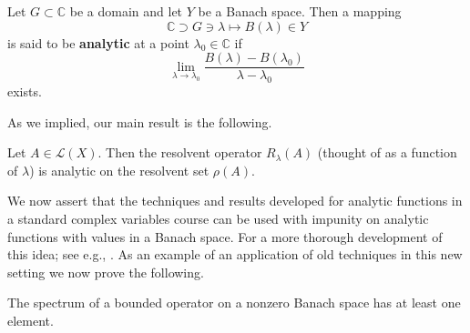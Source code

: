 \begin{Definition}
\label{def:banach-valued-analytic-function}
Let $G\subset\mathbb{C}$ be a domain and let $Y$ be a Banach space. Then a mapping
\begin{equation}\label{eq:banach-valued-complex-function-map}
\mathbb{C}\supset G\ni\lambda\mapsto B(\lambda)\in Y
\end{equation}
is said to be \textbf{analytic} at a point $\lambda_0\in\mathbb{C}$ if
\begin{equation}\label{eq:banach-valued-analytic-function-difference-quotient}
\lim_{\lambda\to\lambda_0}\dfrac{B(\lambda)-B(\lambda_0)}{\lambda-\lambda_0}
\end{equation}
exists.
\end{Definition}

As we implied, our main result is the following.

\begin{Theorem}
\label{thm:bounded-operator-analytic-resolvent}
Let $A\in\mathcal{L}(X)$. Then the resolvent operator $R_\lambda(A)$ (thought of as a function of $\lambda$) is analytic on the resolvent set $\rho(A)$.
\end{Theorem}

\begingroup
{}
\renewcommand{\endProof}{\par\nobreak\hfill$\blacksquare$\par\vspace{0.1cm}}
\endgroup

We now assert that the techniques and results developed for analytic functions in a standard complex variables course can be used with impunity on analytic functions with values in a Banach space. For a more thorough development of this idea; see e.g., \cite{DS}. As an example of an application of old techniques in this new setting we now prove the following.

\begin{Theorem}
\label{thm:bounded-operator-nonempty-spectrum}
The spectrum of a bounded operator on a nonzero Banach space has at least one element.
\end{Theorem}

